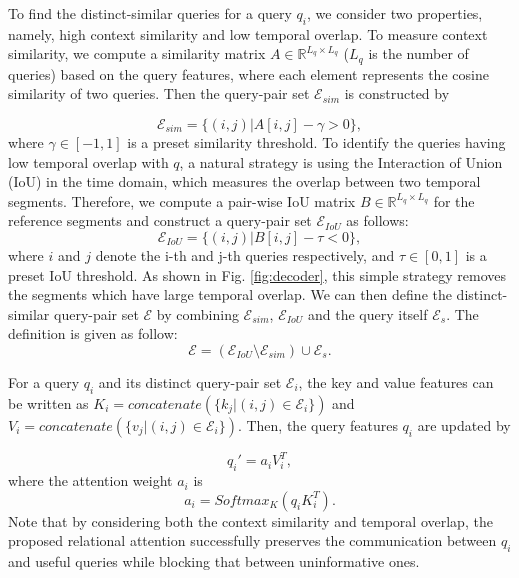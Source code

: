 \documentclass[runningheads]{llncs}
\newcommand{\figref}[1]{Fig. \ref{#1}}
\newcommand{\mc}[1]{\mathcal{#1}}
\newcommand{\mb}[1]{\mathbb{#1}}
\begin{document}
To find the distinct-similar queries for a query $q_i$, we consider two properties, namely, high context similarity and low temporal overlap.
To measure context similarity, we compute a similarity matrix $A\in\mb{R}^{L_q\times L_q}$ ($L_q$ is the number of queries) based on the query features, where each element represents the cosine similarity of two queries. Then the query-pair set $\mc{E}_{sim}$ is constructed by

\begin{equation}
\mc{E}_{sim}=\{(i,j) | A[i,j]-\gamma>0\},
\end{equation}
where $\gamma \in [-1,1]$ is a preset similarity threshold.
To identify the queries having low temporal overlap with $q$, a natural strategy is using the Interaction of Union (IoU) in the time domain, which measures the overlap between two temporal segments. Therefore, we compute a pair-wise IoU matrix $B \in\mb{R}^{L_q \times L_q}$ for the reference segments and construct a query-pair set $\mc{E}_{IoU}$ as follows:          
\begin{equation}
\mc{E}_{IoU}=\{(i,j) | B[i,j]-\tau<0\},
\end{equation}
where $i$ and $j$ denote the i-th and j-th queries respectively, and $\tau \in[0,1]$ is a preset IoU threshold. As shown in \figref{fig:decoder}, this simple strategy removes the segments which have large temporal overlap. 
We can then define the distinct-similar query-pair set $\mc{E}$ by combining $\mc{E}_{sim}$, $\mc{E}_{IoU}$ and the query itself $\mc{E}_s$. The definition is given as follow: 
\begin{equation}
\mc{E}= (\mc{E}_{IoU} \setminus \mc{E}_{sim} )\cup \mc{E}_s.
\end{equation}





For a query $q_i$ and its distinct query-pair set $\mc{E}_i$, the key and value features can be written as $K_i=concatenate(\{k_j | (i,j) \in \mc{E}_i\})$ and $V_i=concatenate(\{v_j | (i,j) \in \mc{E}_i\})$. Then, the query features $q_i$ are updated by

\begin{equation}
    q_i' = a_iV_i^T,
\end{equation}
where the attention weight $a_i$ is
\begin{equation}
    a_i = Softmax_{K}(q_i K_i^T).
\end{equation}
Note that by considering both the context similarity and temporal overlap, the proposed relational attention successfully preserves the communication between $q_i$ and useful queries while blocking that between uninformative ones. 
\end{document}
